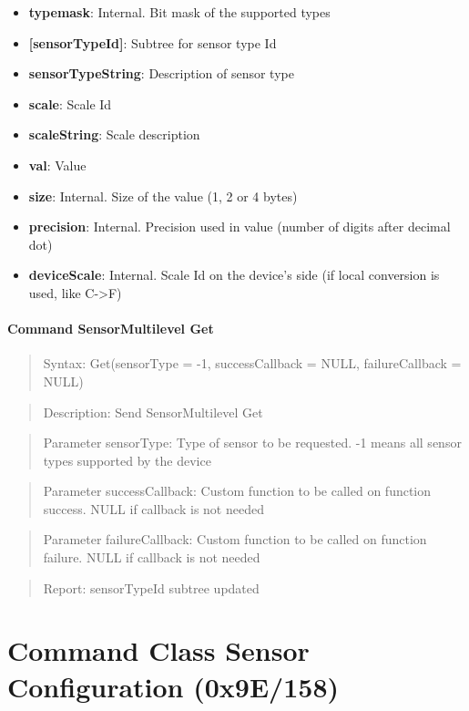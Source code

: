 \begin{itemize}
\item \textbf{typemask}: Internal. Bit mask of the supported types
\item \textbf{[sensorTypeId]}: Subtree for sensor type Id
\item \qquad\textbf{sensorTypeString}: Description of sensor type
\item \qquad\textbf{scale}: Scale Id
\item \qquad\textbf{scaleString}: Scale description
\item \qquad\textbf{val}: Value
\item \qquad\textbf{size}: Internal. Size of the value (1, 2 or 4 bytes)
\item \qquad\textbf{precision}: Internal. Precision used in value (number of digits after decimal dot)
\item \qquad\textbf{deviceScale}: Internal. Scale Id on the device's side (if local conversion is used, like C->F)
\end{itemize}

\paragraph{Command SensorMultilevel Get}
\begin{quote}Syntax: Get(sensorType = -1, successCallback = NULL, failureCallback = NULL)\end{quote}
\begin{quote}Description: Send SensorMultilevel Get\end{quote}
\begin{quote}Parameter sensorType: Type of sensor to be requested. -1 means all sensor types supported by the device\end{quote}
\begin{quote}Parameter successCallback: Custom function to be called on function success. NULL if callback is not needed\end{quote}
\begin{quote}Parameter failureCallback: Custom function to be called on function failure. NULL if callback is not needed\end{quote}
\begin{quote}Report: sensorTypeId subtree updated\end{quote}


\section{Command Class Sensor Configuration (0x9E/158)}


